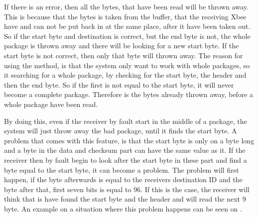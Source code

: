 If there is an error, then all the bytes, that have been read will be thrown away. This is because that the bytes is taken from the buffer, that the receiving Xbee have and can not be put back in at the same place, after it have been taken out. So if the start byte and destination is correct, but the end byte is not, the whole package is thrown away and there will be looking for a new start byte. If the start byte is not correct, then only that byte will thrown away. The reason for using the method, is that the system only want to work with whole packages, so it searching for a whole package, by checking for the start byte, the header and then the end byte. So if the first is not equal to the start byte, it will never become a complete package. Therefore is the bytes already thrown away, before a whole package have been read.

By doing this, even if the receiver by fault start in the middle of a package, the system will just throw away the bad package, until it finds the start byte. A problem that comes with this feature, is that the start byte is only on a byte long and a byte in the data and checksum part can have the same value as it. If the receiver then by fault begin to look after the start byte in these part and find a byte equal to the start byte, it can become a problem. The problem will first happen, if the byte afterwards is equal to the receivers destination ID and the byte after that, first seven bits is equal to 96. If this is the case, the receiver will think that is have found the start byte and the header and will read the next 9 byte. An example on a situation where this problem happens can be seen on .


